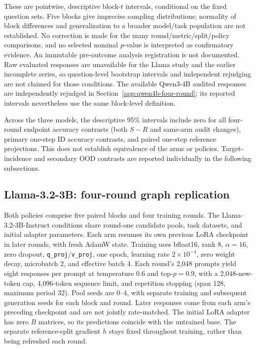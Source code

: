 These are pointwise, descriptive block-$t$ intervals, conditional on the
fixed question sets. Five blocks give imprecise sampling distributions;
normality of block differences and generalization to a broader model/task
population are not established. No correction is made for the many
round/metric/split/policy comparisons, and no selected nominal $p$-value
is interpreted as confirmatory evidence. An immutable pre-outcome analysis
registration is not documented. Raw evaluated responses are unavailable
for the Llama study and the earlier incomplete series, so question-level
bootstrap intervals and independent rejudging are not claimed for those
conditions. The available Qwen3-4B audited responses are independently
rejudged in Section~\ref{app:qwen4b-four-round}; its reported intervals
nevertheless use the same block-level definition.

Across the three models, the descriptive 95\% intervals include zero for
all four-round endpoint accuracy contrasts (both $S-R$ and same-arm audit
changes), primary one-step ID accuracy contrasts, and paired one-step
reference projections. This does not establish equivalence of the arms
or policies. Target-incidence and secondary OOD contrasts are reported
individually in the following subsections.

\subsection{Llama-3.2-3B: four-round graph replication}
\label{app:llama-four-round}
Both policies comprise five paired blocks and four training rounds.
The Llama-3.2-3B-Instruct conditions share round-one candidate pools,
task datasets, and initial adapter parameters. Each arm resumes its own
previous LoRA checkpoint in later rounds, with fresh AdamW state.
Training uses bfloat16, rank 8, $\alpha=16$, zero dropout,
\texttt{q\_proj}/\texttt{v\_proj}, one epoch, learning rate
$2\times10^{-4}$, zero weight decay, microbatch 2, and effective batch 4.
Each round's 2,048 prompts yield eight responses per prompt at temperature
$0.6$ and top-$p=0.9$, with a 2,048-new-token cap, 4,096-token sequence
limit, and repetition stopping (span 128, maximum period 32).
Pool seeds are 0--4, with separate training and subsequent generation
seeds for each block and round. Later responses come from each arm's
preceding checkpoint and are not jointly rate-matched.
The initial LoRA adapter has zero $B$ matrices, so its predictions coincide
with the untrained base. The separate reference-split gradient $h$ stays
fixed throughout training, rather than being refreshed each round.

